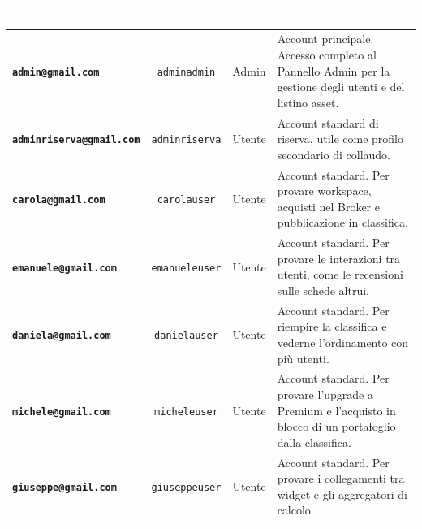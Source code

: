 \begin{table}[H]
\centering
{}
\renewcommand{\arraystretch}{1.3}
\begin{tabularx}{\textwidth}{|l|c|c|X|}
\hline
\rowcolor[HTML]{3B3766}
\textcolor{white}{\textbf{Email}} & \textcolor{white}{\textbf{Password}} & \textcolor{white}{\textbf{Ruolo}} & \textcolor{white}{\textbf{Scopo del Test}} \\ \hline
\textbf{\texttt{admin@gmail.com}} & \texttt{adminadmin} & Admin & Account principale. Accesso completo al Pannello Admin per la gestione degli utenti e del listino asset. \\ \hline
\textbf{\texttt{adminriserva@gmail.com}} & \texttt{adminriserva} & Utente & Account standard di riserva, utile come profilo secondario di collaudo. \\ \hline
\textbf{\texttt{carola@gmail.com}} & \texttt{carolauser} & Utente & Account standard. Per provare workspace, acquisti nel Broker e pubblicazione in classifica. \\ \hline
\textbf{\texttt{emanuele@gmail.com}} & \texttt{emanueleuser} & Utente & Account standard. Per provare le interazioni tra utenti, come le recensioni sulle schede altrui. \\ \hline
\textbf{\texttt{daniela@gmail.com}} & \texttt{danielauser} & Utente & Account standard. Per riempire la classifica e vederne l'ordinamento con più utenti. \\ \hline
\textbf{\texttt{michele@gmail.com}} & \texttt{micheleuser} & Utente & Account standard. Per provare l'upgrade a Premium e l'acquisto in blocco di un portafoglio dalla classifica. \\ \hline
\textbf{\texttt{giuseppe@gmail.com}} & \texttt{giuseppeuser} & Utente & Account standard. Per provare i collegamenti tra widget e gli aggregatori di calcolo. \\ \hline
\end{tabularx}
\end{table}